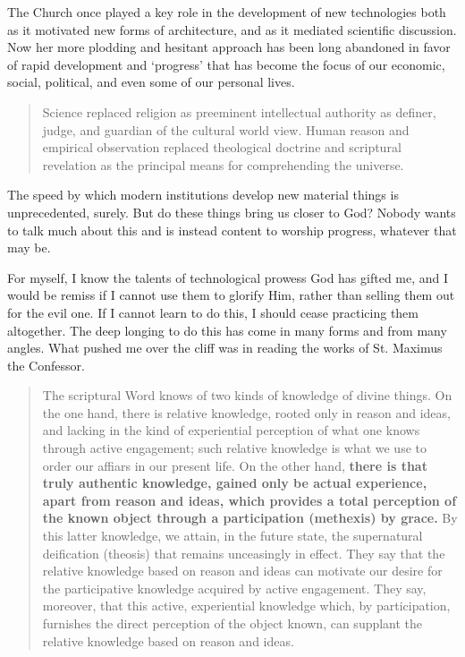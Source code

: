 \documentclass[letterpaper]{article}
\begin{document}
The Church once played a key role in the development of new technologies both as it motivated new forms of architecture, and as it mediated scientific discussion. Now her more plodding and hesitant approach has been long abandoned in favor of rapid development and `progress' that has become the focus of our economic, social, political, and even some of our personal lives.

\begin{quote}
  Science replaced religion as preeminent intellectual authority as definer, judge, and guardian of the cultural world view. Human reason and empirical observation replaced theological doctrine and scriptural revelation as the principal means for comprehending the universe.
\end{quote}

The speed by which modern institutions develop new material things is unprecedented, surely. But do these things bring us closer to God? Nobody wants to talk much about this and is instead content to worship progress, whatever that may be.

\iffalse
For myself, I know the talents of technological prowess God has gifted me, and I would be remiss if I cannot use them to glorify Him, rather than selling them out for the evil one. If I cannot learn to do this, I should cease practicing them altogether. The deep longing to do this has come in many forms and from many angles. What pushed me over the cliff was in reading the works of St. Maximus the Confessor.

\begin{quote}
  The scriptural Word knows of two kinds of knowledge of divine things. On the one hand, there is relative knowledge, rooted only in reason and ideas, and lacking in the kind of experiential perception of what one knows through active engagement; such relative knowledge is what we use to order our affiars in our present life. On the other hand, \textbf{there is that truly authentic knowledge, gained only be actual experience, apart from reason and ideas, which provides a total perception of the known object through a participation (methexis) by grace.} By this latter knowledge, we attain, in the future state, the supernatural deification (theosis) that remains unceasingly in effect. They say that the relative knowledge based on reason and ideas can motivate our desire for the participative knowledge acquired by active engagement. They say, moreover, that this active, experiential knowledge which, by participation, furnishes the direct perception of the object known, can supplant the relative knowledge based on reason and ideas.
\end{quote}
\end{document}
